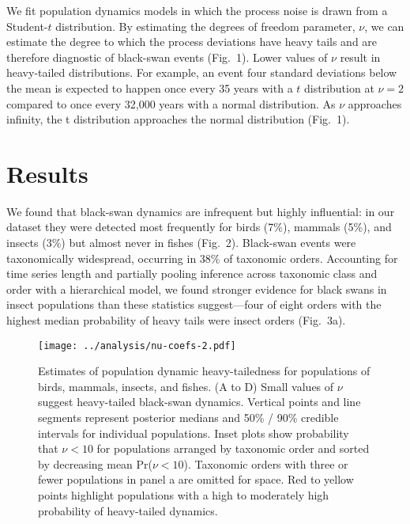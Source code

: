 \documentclass[9pt,twocolumn,twoside]{pnas-new}
\begin{document}
We fit population dynamics models in which the process noise is
drawn from a Student-$t$ distribution. By estimating the degrees of freedom
parameter, \(\nu\), we can estimate the degree to which the process deviations
have heavy tails and are therefore diagnostic of black-swan events (Fig.~1).
Lower values of \(\nu\) result in heavy-tailed distributions.
For example, an event four standard deviations below the mean
is expected to happen once every 35 years with a $t$ distribution at \(\nu = 2\)
compared to once every 32,000 years with a normal distribution.
As \(\nu\) approaches infinity, the t
distribution approaches the normal distribution (Fig.~1).

\section*{Results}

We found that black-swan dynamics are infrequent but highly
influential: in our dataset they were detected most
frequently for birds (7\%), mammals (5\%), and
insects (3\%) but almost never in fishes (Fig.~2). Black-swan
events were taxonomically widespread, occurring in 38\% of taxonomic orders.
Accounting for time series length and partially pooling inference across
taxonomic class and order with a hierarchical model, we found stronger evidence
for black swans in insect populations than these statistics suggest---four of
eight orders with the highest median probability of heavy tails were insect
orders (Fig.~3a).

\begin{figure}[htb]
\centering
\texttt{[image: ../analysis/nu-coefs-2.pdf]}
\caption{Estimates of population dynamic heavy-tailedness for
populations of birds, mammals, insects, and fishes. (A to D)
Small values of \(\nu\) suggest heavy-tailed black-swan dynamics. Vertical
points and line segments represent posterior medians and 50\% / 90\% credible
intervals for individual populations. Inset plots show probability that \(\nu
< 10\) for populations arranged by taxonomic order and sorted by decreasing
mean Pr(\(\nu < 10\)). Taxonomic orders with three or fewer populations in
panel a are omitted for space. Red to yellow points highlight populations
with a high to moderately high probability of heavy-tailed dynamics.
}
\label{fig:2}
\end{figure}
\end{document}
